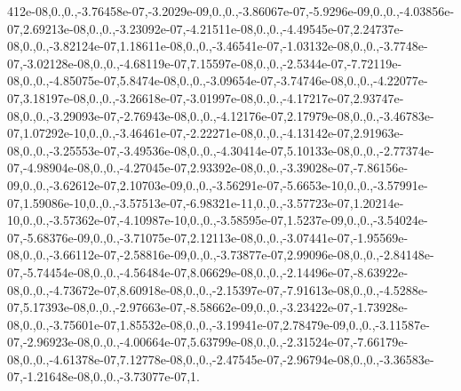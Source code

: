 \begin{DoxyCompactItemize}
412e-\/08,0.,0.,-\/3.\-76458e-\/07,-\/3.\-2029e-\/09,0.,0.,-\/3.\-86067e-\/07,-\/5.\-9296e-\/09,0.,0.,-\/4.\-03856e-\/07,2.\-69213e-\/08,0.,0.,-\/3.\-23092e-\/07,-\/4.\-21511e-\/08,0.,0.,-\/4.\-49545e-\/07,2.\-24737e-\/08,0.,0.,-\/3.\-82124e-\/07,1.\-18611e-\/08,0.,0.,-\/3.\-46541e-\/07,-\/1.\-03132e-\/08,0.,0.,-\/3.\-7748e-\/07,-\/3.\-02128e-\/08,0.,0.,-\/4.\-68119e-\/07,7.\-15597e-\/08,0.,0.,-\/2.\-5344e-\/07,-\/7.\-72119e-\/08,0.,0.,-\/4.\-85075e-\/07,5.\-8474e-\/08,0.,0.,-\/3.\-09654e-\/07,-\/3.\-74746e-\/08,0.,0.,-\/4.\-22077e-\/07,3.\-18197e-\/08,0.,0.,-\/3.\-26618e-\/07,-\/3.\-01997e-\/08,0.,0.,-\/4.\-17217e-\/07,2.\-93747e-\/08,0.,0.,-\/3.\-29093e-\/07,-\/2.\-76943e-\/08,0.,0.,-\/4.\-12176e-\/07,2.\-17979e-\/08,0.,0.,-\/3.\-46783e-\/07,1.\-07292e-\/10,0.,0.,-\/3.\-46461e-\/07,-\/2.\-22271e-\/08,0.,0.,-\/4.\-13142e-\/07,2.\-91963e-\/08,0.,0.,-\/3.\-25553e-\/07,-\/3.\-49536e-\/08,0.,0.,-\/4.\-30414e-\/07,5.\-10133e-\/08,0.,0.,-\/2.\-77374e-\/07,-\/4.\-98904e-\/08,0.,0.,-\/4.\-27045e-\/07,2.\-93392e-\/08,0.,0.,-\/3.\-39028e-\/07,-\/7.\-86156e-\/09,0.,0.,-\/3.\-62612e-\/07,2.\-10703e-\/09,0.,0.,-\/3.\-56291e-\/07,-\/5.\-6653e-\/10,0.,0.,-\/3.\-57991e-\/07,1.\-59086e-\/10,0.,0.,-\/3.\-57513e-\/07,-\/6.\-98321e-\/11,0.,0.,-\/3.\-57723e-\/07,1.\-20214e-\/10,0.,0.,-\/3.\-57362e-\/07,-\/4.\-10987e-\/10,0.,0.,-\/3.\-58595e-\/07,1.\-5237e-\/09,0.,0.,-\/3.\-54024e-\/07,-\/5.\-68376e-\/09,0.,0.,-\/3.\-71075e-\/07,2.\-12113e-\/08,0.,0.,-\/3.\-07441e-\/07,-\/1.\-95569e-\/08,0.,0.,-\/3.\-66112e-\/07,-\/2.\-58816e-\/09,0.,0.,-\/3.\-73877e-\/07,2.\-99096e-\/08,0.,0.,-\/2.\-84148e-\/07,-\/5.\-74454e-\/08,0.,0.,-\/4.\-56484e-\/07,8.\-06629e-\/08,0.,0.,-\/2.\-14496e-\/07,-\/8.\-63922e-\/08,0.,0.,-\/4.\-73672e-\/07,8.\-60918e-\/08,0.,0.,-\/2.\-15397e-\/07,-\/7.\-91613e-\/08,0.,0.,-\/4.\-5288e-\/07,5.\-17393e-\/08,0.,0.,-\/2.\-97663e-\/07,-\/8.\-58662e-\/09,0.,0.,-\/3.\-23422e-\/07,-\/1.\-73928e-\/08,0.,0.,-\/3.\-75601e-\/07,1.\-85532e-\/08,0.,0.,-\/3.\-19941e-\/07,2.\-78479e-\/09,0.,0.,-\/3.\-11587e-\/07,-\/2.\-96923e-\/08,0.,0.,-\/4.\-00664e-\/07,5.\-63799e-\/08,0.,0.,-\/2.\-31524e-\/07,-\/7.\-66179e-\/08,0.,0.,-\/4.\-61378e-\/07,7.\-12778e-\/08,0.,0.,-\/2.\-47545e-\/07,-\/2.\-96794e-\/08,0.,0.,-\/3.\-36583e-\/07,-\/1.\-21648e-\/08,0.,0.,-\/3.\-73077e-\/07,1.
\end{DoxyCompactItemize}
